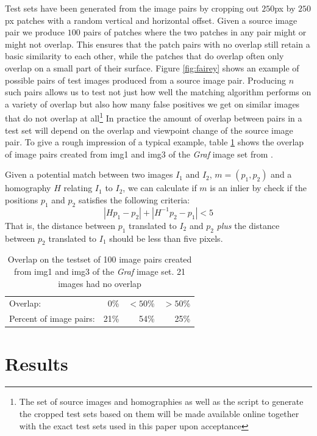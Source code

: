 \documentclass[conference]{IEEEtran}
\begin{document}
Test sets have been generated from the image pairs by cropping out 
$250$px by $250$px patches with a random vertical and horizontal offset.  
Given a source image pair we produce $100$ pairs of patches where the 
two patches in any pair might or might not overlap.  This ensures that 
the patch pairs with no overlap still retain a basic similarity to each 
other, while the patches that do overlap often only overlap on a small 
part of their surface. Figure \ref{fig:fairey} shows an example of 
possible pairs of test images produced from a source image pair.  
Producing $n$ such pairs allows us to test not just how well the 
matching algorithm performs on a variety of overlap but also how many 
false positives we get on similar images that do not overlap at 
all\footnote{The set of source images and homographies as well as the 
script to generate the cropped test sets based on them will be made 
available online together with the exact test sets used in this paper 
upon acceptance}
In practice the amount of overlap between pairs in a test set will 
depend on the overlap and viewpoint change of the source image pair.  To 
give a rough impression of a typical example, table \ref{table:overlap} 
shows the overlap of image pairs created from img1 and img3 of the 
\emph{Graf} image set from \cite{mikolajczyk2005performance}.

Given a potential match between two images $I_1$ and $I_2$, $m = 
\left(p_1, p_2\right)$ and a homography $H$ relating $I_1$ to $I_2$, we 
can calculate if $m$ is an inlier by check if the positions $p_1$ and 
$p_2$ satisfies the following criteria:
$$\left\vert Hp_1 - p_2 \right\vert + \left\vert H^{-1}p_2 - p_1 
\right\vert < 5$$
That is, the distance between $p_1$ translated to $I_2$ and $p_2$ 
\emph{plus} the distance between $p_2$ translated to $I_1$ should be 
less than five pixels.

\begin{table}
	\centering
	\small
\begin{tabular}{l*{3}{r}}
	Overlap: & 0\% & $< 50$\% & $> 50$\%  \\
	\noalign{\smallskip}
	Percent of image pairs: & 21\% & 54\% & 25\% \\
\end{tabular}
\caption{Overlap on the testset of 100 image pairs created from img1 and 
img3 of the \emph{Graf} image set. 21 images had no overlap}
\label{table:overlap}
\end{table}
\section{Results}
\label{results}
\end{document}
